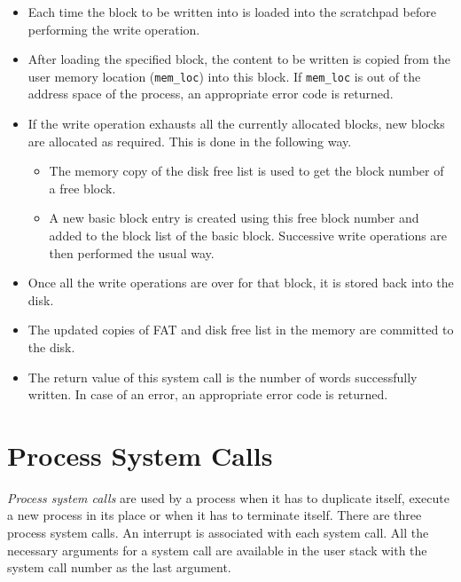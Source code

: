 \documentclass[10pt]{report}
\newcounter{syscall}
\begin{document}
\begin{itemize}
	\item Each time the block to be written into is loaded into the scratchpad before performing the write operation.
	
	\item After loading the specified block, the content to be written is copied from the user memory location (\texttt{mem\_loc}) into this block. If \texttt{mem\_loc} is out of the address space of the process, an appropriate error code is returned.
	
	\item If the write operation exhausts all the currently allocated blocks, new blocks are allocated as required. This is done in the following way.
	\begin{itemize}
		\item The memory copy of the disk free list  is used to get the block number of a free block.
		\item A new basic block entry is created using this free block number and added to the block list of the basic block. Successive write operations are then performed the usual way.
	\end{itemize}
	
	\item Once all the write operations are over for that block, it is stored back into the disk.
	
	\item The updated copies of FAT  and disk free list 
	 in the memory are committed to the disk.
	
	\item The return value of this system call is the number of words successfully written. In case of an error, an appropriate error code is returned.
\end{itemize}


\section{Process System Calls}
\label{procsyscall}
\textit{Process system calls} are used by a process when it has to duplicate itself, execute a new process in its place or when it has to terminate itself. There are three process system calls. An interrupt is associated with each system call. All the necessary arguments for a system call are available in the user stack with the system call number as the last argument.\\
\end{document}
